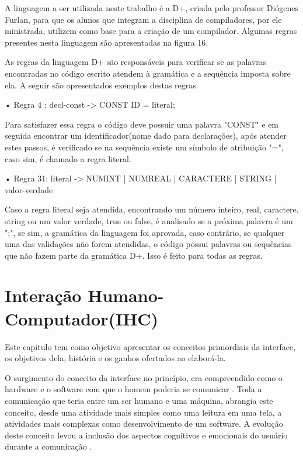 \documentclass[12pt,oneside,a4paper,chapter=TITLE,section=TITLE,sumario=tradicional]{abntex2}
\begin{document}
A linguagem a ser utilizada neste trabalho é a D+, criada pelo professor Diógenes Furlan, para que os alunos que integram a disciplina de compiladores, por ele ministrada, utilizem como base para a criação de um compilador. Algumas regras presentes nesta linguagem são apresentadas na figura 16.

\begin{figure}[htb]
\end{figure}

As regras da linguagem D+ são responsáveis para verificar se as palavras encontradas no código escrito atendem à gramática e a sequência imposta sobre ela. A seguir são apresentados exemplos destas regras.

•	Regra 4 : decl-const -> CONST ID = literal;

Para satisfazer essa regra o código deve possuir uma palavra "CONST" e em seguida encontrar um identificador(nome dado para declarações), após atender estes passos, é verificado se na sequência existe um símbolo de atribuição "=", caso sim, é chamado a regra literal.

•	Regra 31: literal -> NUMINT | NUMREAL | CARACTERE | STRING | valor-verdade

Caso a regra literal seja atendida, encontrando um número inteiro, real, caractere, string ou um valor verdade, true ou false, é analisado se a próxima palavra é um ";", se sim, a gramática da linguagem foi aprovada, caso contrário, se qualquer uma das validações não forem atendidas, o código possui palavras ou sequências que não fazem parte da gramática D+. Isso é feito para todas as regras. 

\chapter{Interação Humano-Computador(IHC)}
\label{cap:interacao-humano-computador}

Este capitulo tem como objetivo apresentar os conceitos primordiais da interface, os objetivos dela, história e os ganhos ofertados ao elaborá-la. 

O surgimento do conceito da interface no princípio, era compreendido como o hardware e o software com que o homem poderia se comunicar \cite{rocha2003}.  Toda a comunicação que teria entre um ser humano e uma máquina, abrangia este conceito, desde uma atividade mais simples como uma leitura em uma tela, a atividades mais complexas como desenvolvimento de um software. A evolução deste conceito levou a inclusão dos aspectos cognitivos e emocionais do usuário durante a comunicação \cite{rocha2003}.
\end{document}
